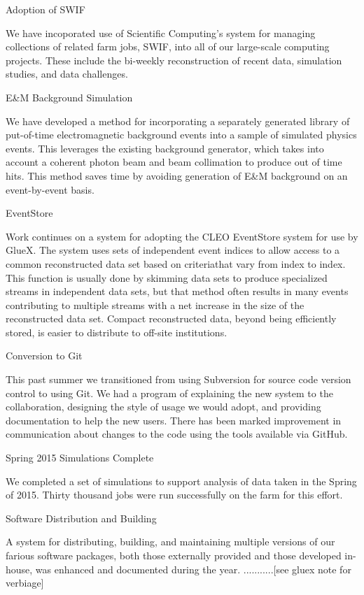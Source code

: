 Adoption of SWIF

We have incoporated use of Scientific Computing's system for managing collections of related farm jobs, SWIF, into all of our large-scale computing projects. These include the bi-weekly reconstruction of recent data, simulation studies, and data challenges.

E&M Background Simulation

We have developed a method for incorporating a separately generated library of put-of-time electromagnetic background events into a sample of simulated physics events. This leverages the existing background generator, which takes into account a coherent photon beam and beam collimation to produce out of time hits. This method saves time by avoiding generation of E&M background on an event-by-event basis.

EventStore

Work continues on a system for adopting the CLEO EventStore system for use by GlueX. The system uses sets of independent event indices to allow access to a common reconstructed data set based on criteriathat vary from index to index. This function is usually done by skimming data sets to produce specialized streams in independent data sets, but that method often results in many events contributing to multiple streams with a net increase in the size of the reconstructed data set. Compact reconstructed data, beyond being efficiently stored, is easier to distribute to off-site institutions.

Conversion to Git

This past summer we transitioned from using Subversion for source code version control to using Git. We had a program of explaining the new system to the collaboration, designing the style of usage we would adopt, and providing documentation to help the new users. There has been marked improvement in communication about changes to the code using the tools available via GitHub.

Spring 2015 Simulations Complete

We completed a set of simulations to support analysis of data taken in the Spring of 2015. Thirty thousand jobs were run successfully on the farm for this effort.

Software Distribution and Building

A system for distributing, building, and maintaining multiple versions of our farious software packages, both those externally provided and those developed in-house, was enhanced and documented during the year. ...........[see gluex note for verbiage]

